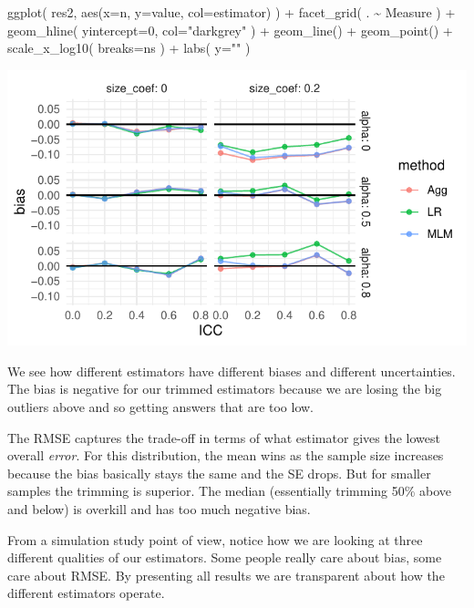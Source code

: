 \documentclass[
]{book}
\newenvironment{Shaded}{\begin{snugshade}}{\end{snugshade}}
\newcommand{\AttributeTok}[1]{\textcolor[rgb]{0.77,0.63,0.00}{#1}}
\newcommand{\DecValTok}[1]{\textcolor[rgb]{0.00,0.00,0.81}{#1}}
\newcommand{\FunctionTok}[1]{\textcolor[rgb]{0.00,0.00,0.00}{#1}}
\newcommand{\NormalTok}[1]{#1}
\newcommand{\SpecialCharTok}[1]{\textcolor[rgb]{0.00,0.00,0.00}{#1}}
\newcommand{\StringTok}[1]{\textcolor[rgb]{0.31,0.60,0.02}{#1}}
\begin{document}
\begin{Shaded}
\begin{Highlighting}[]
\FunctionTok{ggplot}\NormalTok{( res2, }\FunctionTok{aes}\NormalTok{(}\AttributeTok{x=}\NormalTok{n, }\AttributeTok{y=}\NormalTok{value, }\AttributeTok{col=}\NormalTok{estimator) ) }\SpecialCharTok{+}
    \FunctionTok{facet\_grid}\NormalTok{( . }\SpecialCharTok{\textasciitilde{}}\NormalTok{ Measure ) }\SpecialCharTok{+}
    \FunctionTok{geom\_hline}\NormalTok{( }\AttributeTok{yintercept=}\DecValTok{0}\NormalTok{, }\AttributeTok{col=}\StringTok{"darkgrey"}\NormalTok{ ) }\SpecialCharTok{+}
    \FunctionTok{geom\_line}\NormalTok{() }\SpecialCharTok{+} \FunctionTok{geom\_point}\NormalTok{() }\SpecialCharTok{+}
    \FunctionTok{scale\_x\_log10}\NormalTok{( }\AttributeTok{breaks=}\NormalTok{ns ) }\SpecialCharTok{+}
    \FunctionTok{labs}\NormalTok{( }\AttributeTok{y=}\StringTok{""}\NormalTok{ )}
\end{Highlighting}
\end{Shaded}

\begin{center}\includegraphics[width=0.75\linewidth]{Designing-Simulations-in-R_files/figure-latex/unnamed-chunk-154-1} \end{center}

We see how different estimators have different biases and different
uncertainties. The bias is negative for our trimmed estimators because we
are losing the big outliers above and so getting answers that are too low.

The RMSE captures the trade-off in terms of what estimator gives the lowest
overall \emph{error}. For this distribution, the mean wins as the sample size
increases because the bias basically stays the same and the SE drops. But
for smaller samples the trimming is superior. The median (essentially
trimming 50\% above and below) is overkill and has too much negative bias.

From a simulation study point of view, notice how we are looking at three
different qualities of our estimators. Some people really care about bias,
some care about RMSE. By presenting all results we are transparent about how
the different estimators operate.
\end{document}
